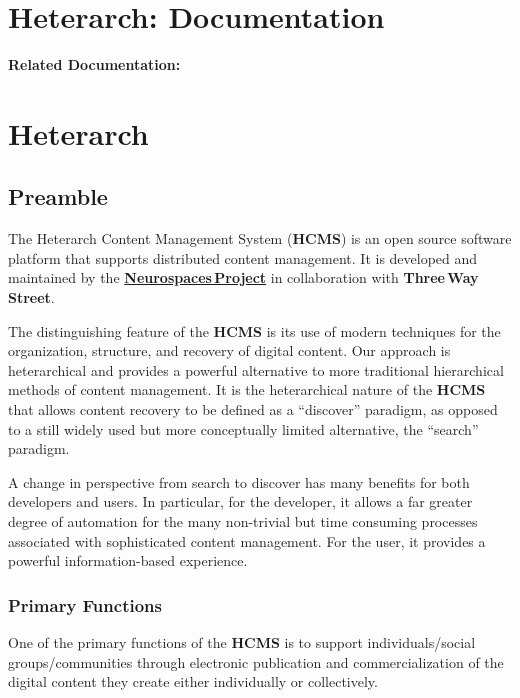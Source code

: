 \documentclass[12pt]{article}
\begin{document}
\section{Heterarch: Documentation}

{\bf Related Documentation:}

\section{Heterarch}

\subsection{Preamble}

The Heterarch Content Management System ({\bf \small HCMS}) is an open source software platform that supports distributed content management. It is developed and maintained by the \href{http://neurospaces.sourceforge.net/}{\bf Neurospaces\,Project} in collaboration with {\bf Three\,Way\,Street}. 

The distinguishing feature of the {\bf \small HCMS} is its use of modern techniques for the organization, structure, and recovery of digital content. Our approach is heterarchical and provides a powerful alternative to more traditional hierarchical methods of content management. It is the heterarchical nature of the {\bf \small HCMS} that allows content recovery to be defined as a ``discover'' paradigm, as opposed to a still widely used but more conceptually limited alternative, the ``search'' paradigm.

A change in perspective from search to discover has many benefits for both developers and users. In particular, for the developer, it allows a far greater degree of automation for the many non-trivial but time consuming processes associated with sophisticated content management. For the user, it provides a powerful information-based experience.

\subsubsection{Primary Functions}

One of the primary functions of the {\bf \small HCMS} is to support individuals/social groups/communities through electronic publication and commercialization of the digital content they create either individually or collectively.
\end{document}
